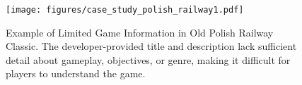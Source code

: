 \begin{figure}[t]
\begin{center}
\centerline{\texttt{[image: figures/case\_study\_polish\_railway1.pdf]}}

\caption{Example of Limited Game Information in Old Polish Railway Classic. The developer-provided title and description lack sufficient detail about gameplay, objectives, or genre, making it difficult for players to understand the game.}
\label{fig:case_study_polish_railway}
\end{center}
\vskip -0.34in
\end{figure}